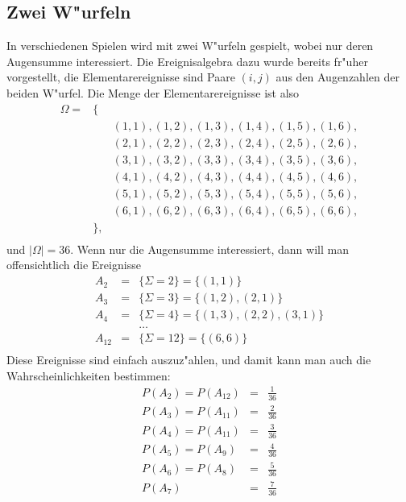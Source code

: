 \subsection{Zwei W"urfeln}
In verschiedenen Spielen wird mit zwei W"urfeln gespielt, wobei nur
deren Augensumme interessiert. Die Ereignisalgebra dazu wurde bereits
fr"uher vorgestellt, die Elementarereignisse sind Paare $(i,j)$ aus
den Augenzahlen der beiden W"urfel. Die Menge der Elementarereignisse
ist also
\begin{eqnarray*}
\Omega=&\{&\\
&&(1,1),(1,2),(1,3),(1,4),(1,5),(1,6),\\
&&(2,1),(2,2),(2,3),(2,4),(2,5),(2,6),\\
&&(3,1),(3,2),(3,3),(3,4),(3,5),(3,6),\\
&&(4,1),(4,2),(4,3),(4,4),(4,5),(4,6),\\
&&(5,1),(5,2),(5,3),(5,4),(5,5),(5,6),\\
&&(6,1),(6,2),(6,3),(6,4),(6,5),(6,6),\\
&\},&\\
\end{eqnarray*}
und $|\Omega|=36$. Wenn nur die Augensumme interessiert, dann will
man offensichtlich die Ereignisse
\begin{eqnarray*}
A_2&=&\{\Sigma=2\}=\{(1,1)\}\\
A_3&=&\{\Sigma=3\}=\{(1,2),(2,1)\}\\
A_4&=&\{\Sigma=4\}=\{(1,3),(2,2),(3,1)\}\\
&&\dots\\
A_{12}&=&\{\Sigma=12\}=\{(6,6)\}\\
\end{eqnarray*}
Diese Ereignisse sind einfach auszuz"ahlen, und damit kann man auch
die Wahrscheinlichkeiten bestimmen:
\begin{eqnarray*}
P(A_2)=P(A_{12})&=&\frac{1}{36}\\
P(A_3)=P(A_{11})&=&\frac{2}{36}\\
P(A_4)=P(A_{11})&=&\frac{3}{36}\\
P(A_5)=P(A_9)&=&\frac{4}{36}\\
P(A_6)=P(A_8)&=&\frac{5}{36}\\
P(A_7)&=&\frac{7}{36}\\
\end{eqnarray*}

